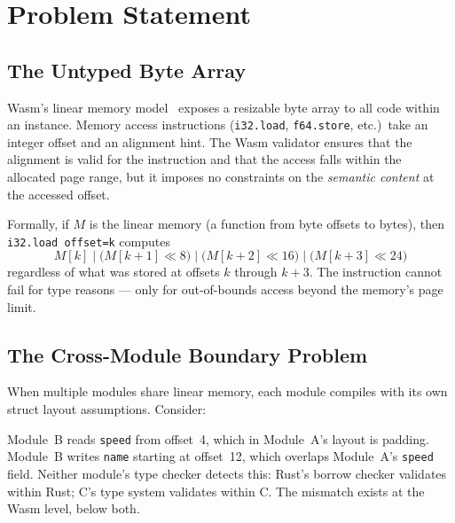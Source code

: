 \documentclass[11pt,a4paper]{article}
\begin{document}
\section{Problem Statement}
\label{sec:problem}

\subsection{The Untyped Byte Array}
\label{sec:untyped}

Wasm's linear memory model~\cite{wasmspec2024} exposes a resizable byte
array to all code within an instance.  Memory access instructions
(\lstinline{i32.load}, \lstinline{f64.store}, etc.)\ take an integer
offset and an alignment hint.  The Wasm validator ensures that the
alignment is valid for the instruction and that the access falls within
the allocated page range, but it imposes no constraints on the
\emph{semantic content} at the accessed offset.

Formally, if $M$ is the linear memory (a function from byte offsets to
bytes), then \lstinline{i32.load offset=k} computes
\[
  M[k] \;\big|\; \bigl(M[k{+}1] \ll 8\bigr) \;\big|\;
  \bigl(M[k{+}2] \ll 16\bigr) \;\big|\;
  \bigl(M[k{+}3] \ll 24\bigr)
\]
regardless of what was stored at offsets $k$ through $k{+}3$.  The
instruction cannot fail for type reasons --- only for out-of-bounds
access beyond the memory's page limit.

\subsection{The Cross-Module Boundary Problem}
\label{sec:crossmodule}

When multiple modules share linear memory, each module compiles with its
own struct layout assumptions.  Consider:


Module~B reads \lstinline{speed} from offset~4, which in Module~A's
layout is padding.  Module~B writes \lstinline{name} starting at
offset~12, which overlaps Module~A's \lstinline{speed} field.  Neither
module's type checker detects this: Rust's borrow checker validates
within Rust; C's type system validates within C.  The mismatch exists at
the Wasm level, below both.
\end{document}

